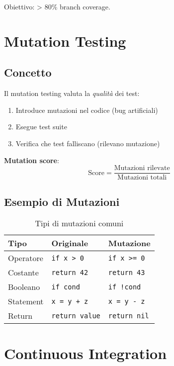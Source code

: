 Obiettivo: > 80\% branch coverage.

\section{Mutation Testing}

\subsection{Concetto}

Il mutation testing valuta la \textit{qualità} dei test:

\begin{enumerate}
\item Introduce mutazioni nel codice (bug artificiali)
\item Esegue test suite
\item Verifica che test falliscano (rilevano mutazione)
\end{enumerate}

\textbf{Mutation score}:
\begin{equation}
\text{Score} = \frac{\text{Mutazioni rilevate}}{\text{Mutazioni totali}}
\end{equation}

\subsection{Esempio di Mutazioni}

\begin{table}[h]
\centering
\small
\begin{tabular}{@{}lll@{}}
\toprule
\textbf{Tipo} & \textbf{Originale} & \textbf{Mutazione} \\
\midrule
Operatore & \texttt{if x > 0} & \texttt{if x >= 0} \\
Costante & \texttt{return 42} & \texttt{return 43} \\
Booleano & \texttt{if cond} & \texttt{if !cond} \\
Statement & \texttt{x = y + z} & \texttt{x = y - z} \\
Return & \texttt{return value} & \texttt{return nil} \\
\bottomrule
\end{tabular}
\caption{Tipi di mutazioni comuni}
\label{tab:mutations}
\end{table}

\section{Continuous Integration}

